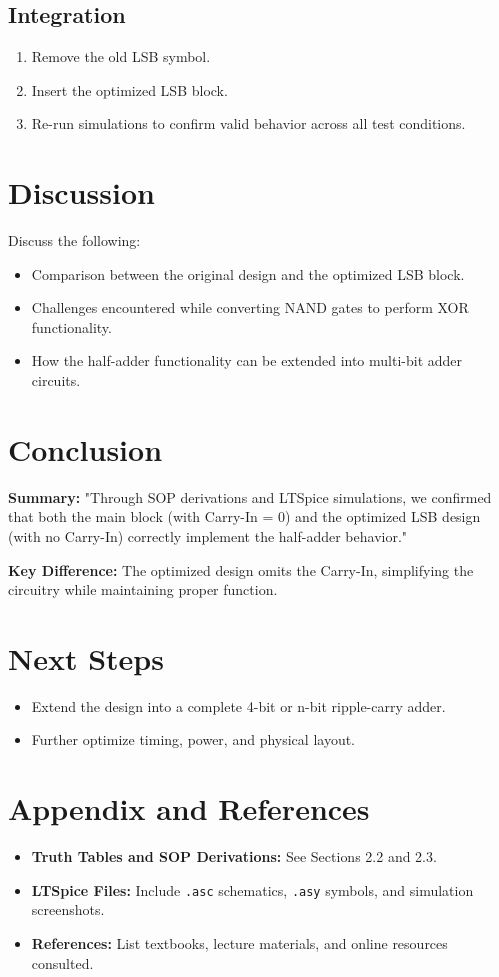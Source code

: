 \documentclass[12pt]{article}
\begin{document}
\subsection{Integration}
\begin{enumerate}
    \item Remove the old LSB symbol.
    \item Insert the optimized LSB block.
    \item Re-run simulations to confirm valid behavior across all test conditions.
\end{enumerate}

\section{Discussion}
Discuss the following:
\begin{itemize}
    \item Comparison between the original design and the optimized LSB block.
    \item Challenges encountered while converting NAND gates to perform XOR functionality.
    \item How the half-adder functionality can be extended into multi-bit adder circuits.
\end{itemize}

\section{Conclusion}
\textbf{Summary:}  
"Through SOP derivations and LTSpice simulations, we confirmed that both the main block (with Carry-In = 0) and the optimized LSB design (with no Carry-In) correctly implement the half-adder behavior."

\noindent \textbf{Key Difference:}  
The optimized design omits the Carry-In, simplifying the circuitry while maintaining proper function.

\section{Next Steps}
\begin{itemize}
    \item Extend the design into a complete 4-bit or n-bit ripple-carry adder.
    \item Further optimize timing, power, and physical layout.
\end{itemize}

\section{Appendix and References}
\begin{itemize}
    \item \textbf{Truth Tables and SOP Derivations:} See Sections 2.2 and 2.3.
    \item \textbf{LTSpice Files:} Include \texttt{.asc} schematics, \texttt{.asy} symbols, and simulation screenshots.
    \item \textbf{References:} List textbooks, lecture materials, and online resources consulted.
\end{itemize}
\end{document}

